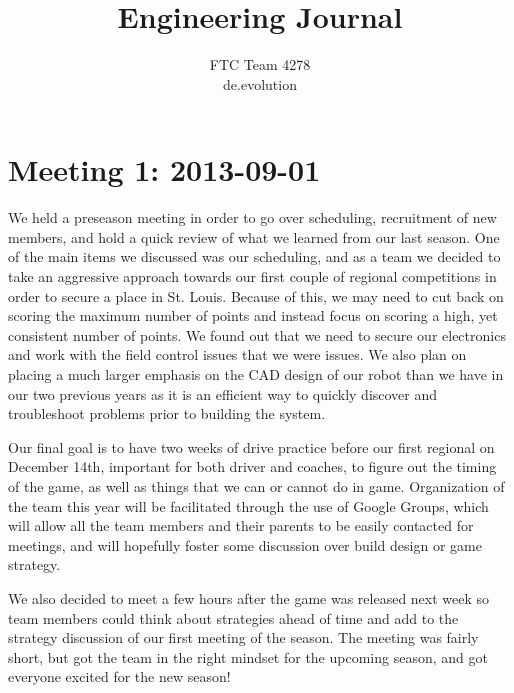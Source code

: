 \documentclass{article}
\title{\textbf{Engineering Journal}}
\author{FTC Team 4278\\de.evolution}
\begin{document}
\maketitle

\section{Meeting 1: 2013-09-01}
We held a preseason meeting in order to go over scheduling, recruitment of new members, and hold a quick review of what we learned from our last season. One of the main items we discussed was our scheduling, and as a team we decided to take an aggressive approach towards our first couple of regional competitions in order to secure a place in St. Louis. Because of this, we may need to cut back on scoring the maximum number of points and instead focus on scoring a high, yet consistent number of points. We found out that we need to secure our electronics and work with the field control issues that we were issues. We also plan on placing a much larger emphasis on the CAD design of our robot than we have in our two previous years as it is an efficient way to quickly discover and troubleshoot problems prior to building the system. 

Our final goal is to have two weeks of drive practice before our first regional on December 14th, important for both driver and coaches, to figure out the timing of the game, as well as things that we can or cannot do in game. Organization of the team this year will be facilitated through the use of Google Groups, which will allow all the team members and their parents to be easily contacted for meetings, and will hopefully foster some discussion over build design or game strategy. 

We also decided to meet a few hours after the game was released next week so team members could think about strategies ahead of time and add to the strategy discussion of our first meeting of the season. The meeting was fairly short, but got the team in the right mindset for the upcoming season, and got everyone excited for the  new season!
\end{document}

